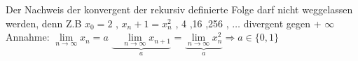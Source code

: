 \begin{remark}
Der Nachweis der konvergent der rekursiv definierte Folge darf nicht weggelassen werden, denn Z.B $x_0=2$ , $x_n+1=x_n^2$ \quad \quad {} , 4 ,16 ,256 , $\dots $ divergent gegen + $\infty$  \\

Annahme: $\lim\limits_{n \rightarrow \infty}{x_n}= a $ 
$\underbrace{\quad \lim\limits_{n \rightarrow \infty}{x_{n+1}}}_{a}$ = 
$\underbrace{\lim\limits_{n \rightarrow \infty}{x_n^2}}_{a} \Rightarrow a \in \{ 0,1 \}$
\end{remark}  


